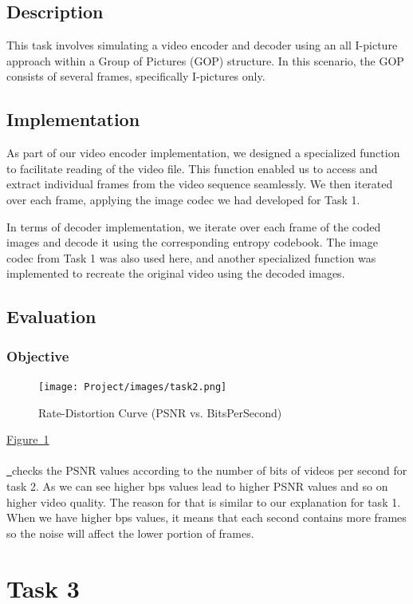 \documentclass{article}
\newcommand*{\figref}[2][]{%
  \hyperref[{fig:#2}]{%
    Figure~\ref*{fig:#2}%
    \ifx\\#1\\%
    \else
      \,#1%
    \fi
  }%
}
\begin{document}
\subsection{Description}

This task involves simulating a video encoder and decoder using an all I-picture approach within a Group of Pictures (GOP) structure. In this scenario, the GOP consists of several frames, specifically I-pictures only.

\subsection{Implementation}

As part of our video encoder implementation, we designed a specialized function to facilitate reading of the video file. This function enabled us to access and extract individual frames from the video sequence seamlessly. We then iterated over each frame, applying the image codec we had developed for Task 1.

In terms of decoder implementation, we iterate over each frame of the coded images and decode it using the corresponding entropy codebook. The image codec from Task 1 was also used here, and another specialized function was implemented to recreate the original video using the decoded images.

\subsection{Evaluation}
\subsubsection{Objective}

\begin{figure}[H]
  \centering
  \texttt{[image: Project/images/task2.png]}
  \caption{Rate-Distortion Curve (PSNR vs. BitsPerSecond)}
  \label{fig:task2}
\end{figure}

\figref{task2} checks the PSNR values according to the number of bits of videos per second for task 2. As we can see higher bps values lead to higher PSNR values and so on higher video quality. The reason for that is similar to our explanation for task 1. When we have higher bps values, it means that each second contains more frames so the noise will affect the lower portion of frames. 




\section{Task 3}
\end{document}
